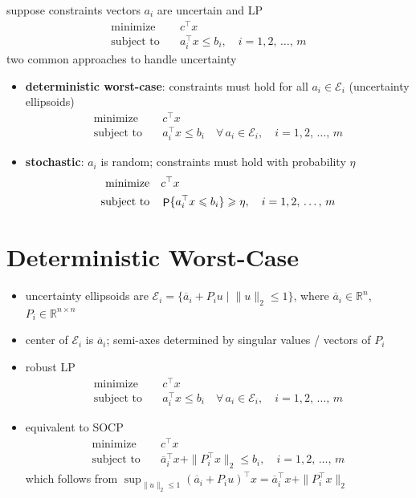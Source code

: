 \documentclass[11pt]{extarticle}
\newcommand{\ds}{\displaystyle}
\DeclareMathOperator\prb{{\sf P}}
\theoremstyle{definition}
\begin{document}
suppose constraints vectors $a_i$ are uncertain and LP
\begin{align*}
  \text{minimize}\quad & c^\top x \\
  \text{subject to}\quad & a_i^\top x \leqslant b_i, \quad i = 1, 2,\,\ldots,\,m 
\end{align*}
two common approaches to handle uncertainty
\begin{itemize}
  \item {\bf deterministic worst-case}: constraints must hold for all $\ds a_i\in\mathcal{E}_i$ (uncertainty ellipsoids) 
    \begin{align*}
      \text{minimize}\quad & c^\top x \\
      \text{subject to}\quad & a_i^\top x \leqslant b_i\quad\forall\,a_i\in\mathcal{E}_i, \quad i = 1, 2,\,\ldots,\,m 
    \end{align*}
  \item {\bf stochastic}: $a_i$ is random; constraints must hold with probability $\eta$ 
    \begin{align*}
      \text{minimize}\quad & c^\top x \\
      \text{subject to}\quad & \prb\{a_i^\top x\leqslant b_i\}\geqslant\eta, \quad i = 1, 2,\,\ldots,\,m 
    \end{align*}
\end{itemize}

\newpage

\section*{Deterministic Worst-Case}

\begin{itemize}
  \item uncertainty ellipsoids are $\ds\mathcal{E}_i = \{\overline{a}_i + P_i u\;|\;\|u\|_2 \leqslant 1\}$, where $\overline{a}_i\in\mathbb{R}^n$, $P_i\in\mathbb{R}^{n\times n}$
  \item center of $\ds\mathcal{E}_i$ is $\overline{a}_i$; semi-axes determined by singular values / vectors of $P_i$
  \item robust LP
    \begin{align*}
      \text{minimize}\quad & c^\top x \\
      \text{subject to}\quad & a_i^\top x \leqslant b_i\quad\forall\,a_i\in\mathcal{E}_i, \quad i = 1, 2,\,\ldots,\,m 
    \end{align*}
  \item equivalent to SOCP
    \begin{align*}
      \text{minimize}\quad & c^\top x \\
      \text{subject to}\quad & \overline{a}_i^\top x + \|P_i^\top x\|_2 \leqslant b_i, \quad i = 1, 2,\,\ldots,\,m 
    \end{align*}
    which follows from $\ds\sup_{\|u\|_2\leqslant 1}(\overline{a}_i + P_i u)^\top x = \overline{a}_i^\top x + \|P_i^\top x\|_2$
\end{itemize}
\end{document}
